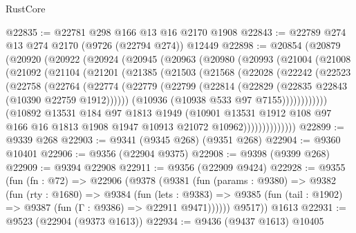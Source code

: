 \begin{lexlean}{RustCore}
\begin{coremodule}
@22835 := @22781 @298 @166 @13 @16 @2170 @1908
@22843 := @22789 @274 @13 @274 @2170 (@9726 (@22794 @274)) @12449
@22898 := @20854
    (@20879
      (@20920
        (@20922
          (@20924
            (@20945
              (@20963
                (@20980
                  (@20993
                    (@21004
                      (@21008
                        (@21092
                          (@21104
                            (@21201
                              (@21385
                                (@21503
                                  (@21568
                                    (@22028
                                      (@22242
                                        (@22523
                                          (@22758
                                            (@22764
                                              (@22774
                                                (@22779
                                                  (@22799
                                                    (@22814
                                                      (@22829
                                                        (@22835 @22843 (@10390 @22759 @1912))))))
                                                (@10936 (@10938 @533 @97 @7155))))))))))))
                            (@10892
                              @13531
                              @184
                              @97
                              @1813
                              @1949
                              (@10901
                                @13531
                                @1912
                                @108
                                @97
                                @166
                                @16
                                @1813
                                @1908
                                @1947
                                @10913
                                @21072
                                @10962))))))))))))))
@22899 := @9339 @268
@22903 := @9341 (@9345 @268) (@9351 @268)
@22904 := @9360 @10401
@22906 := @9356 (@22904 @9375)
@22908 := @9398 (@9399 @268)
@22909 := @9394 @22908
@22911 := @9356 (@22909 @9424)
@22928 := @9355
    (fun (fn : @72) =>
    @22906
      (@9378
        (@9381
          (fun (params : @9380) =>
          @9382
            (fun (rty : @1680) =>
            @9384
              (fun (lets : @9383) =>
              @9385 (fun (tail : @1902) => @9387 (fun (Γ : @9386) => @22911 @9471))))))
        @9517))
    @1613
@22931 := @9523 (@22904 (@9373 @1613))
@22934 := @9436 (@9437 @1613) @10405

\end{coremodule}
\end{lexlean}
